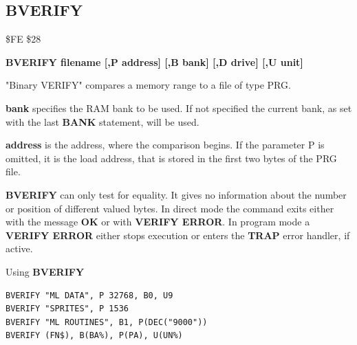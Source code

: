 
\newpage
\subsection{BVERIFY}
\begin{description}[leftmargin=2cm,style=nextline]
\item [Token:] \$FE \$28
\item [Format:] {\bf BVERIFY filename [,P address]
                [,B bank] [,D drive] [,U unit] }
\item [Usage:]
   "Binary VERIFY" compares a memory range to
   a file of type PRG.

   \filenamedefinition

   {\bf bank} specifies the RAM bank to be used.
   If not specified the current bank, as set with the last
   {\bf BANK} statement, will be used.

   {\bf address} is the address, where the comparison begins.
   If the parameter P is omitted, it is the load address,
   that is stored in the first two bytes of the PRG file.

   \drivedefinition

   \unitdefinition

\item [Remarks:]
   {\bf BVERIFY} can only test for equality. It gives no information
   about the number or position of different valued bytes.
   In direct mode the command exits either with the message {\bf OK}
   or with {\bf VERIFY ERROR}. In program mode a {\bf VERIFY ERROR}
   either stops execution or enters the {\bf TRAP} error handler,
   if active.

\item [Example:] Using {\bf BVERIFY}
\begin{tcolorbox}[colback=black,coltext=white]
\verbatimfont{\codefont}
\begin{verbatim}
BVERIFY "ML DATA", P 32768, B0, U9
BVERIFY "SPRITES", P 1536
BVERIFY "ML ROUTINES", B1, P(DEC("9000"))
BVERIFY (FN$), B(BA%), P(PA), U(UN%)
\end{verbatim}
\end{tcolorbox}
\end{description}


\newpage
